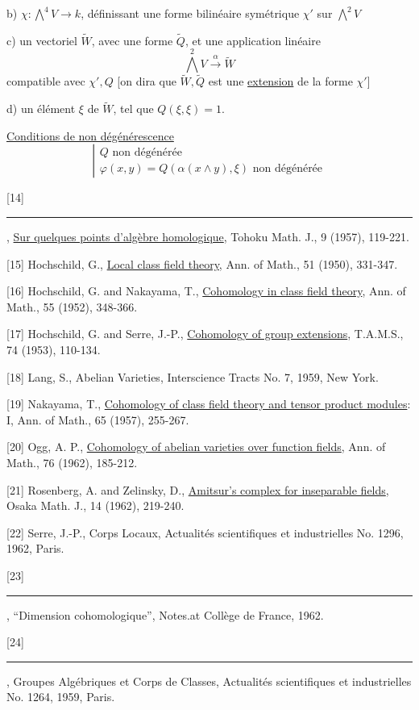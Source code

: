 
b) $\chi:\bigwedge^4V\longrightarrow k$, définissant une forme bilinéaire symétrique $\chi'$ sur $\bigwedge^2V$

c) un vectoriel $\widetilde W$, avec une forme  $\widetilde Q$, et une application linéaire
\[
\bigwedge^2V\xrightarrow{\alpha}\widetilde W
\]
compatible avec $\chi',Q$ [on dira que $\widetilde W,\widetilde Q$ est une \uline{extension} de la forme $\chi'$]

d) un élément $\xi$ de $\widetilde W$, tel que $Q(\xi,\xi)=1$.

\uline{Conditions de non dégénérescence}
\[
\left|\begin{array}{l}
Q\text{ non dégénérée}\\
\varphi(x,y)=Q(\alpha(x\wedge y),\xi)\text{ non dégénérée}
\end{array}\right.
\]

[14] \rule{2cm}{0.4pt}, \uline{Sur quelques points d'algèbre homologique}, Tohoku Math. J., 9 (1957), 119-221.

[15] Hochschild, G., \uline{Local class field theory}, Ann. of Math., 51 (1950), 331-347.

[16] Hochschild, G. and Nakayama, T., \uline{Cohomology in class field theory}, Ann. of Math., 55 (1952), 348-366.

[17] Hochschild, G. and Serre, J.-P., \uline{Cohomology of group extensions}, T.A.M.S., 74 (1953), 110-134.

[18] Lang, S., Abelian Varieties, Interscience Tracts No. 7, 1959, New York.

[19] Nakayama, T., \uline{Cohomology of class field theory and tensor product modules}: I, Ann. of Math., 65 (1957), 255-267.

[20] Ogg, A. P., \uline{Cohomology of abelian varieties over function fields}, Ann. of Math., 76 (1962), 185-212.

[21] Rosenberg, A. and Zelinsky, D., \uline{Amitsur's complex for inseparable fields}, Osaka Math. J., 14 (1962), 219-240.

[22] Serre, J.-P., Corps Locaux, Actualités scientifiques et industrielles No. 1296, 1962, Paris.

[23] \rule{2cm}{0.4pt}, ``Dimension cohomologique'', Notes.at Collège de France, 1962.

[24] \rule{2cm}{0.4pt}, Groupes Algébriques et Corps de Classes, Actualités scientifiques et industrielles No. 1264, 1959, Paris.

